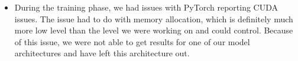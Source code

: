\begin{notsw}
\begin{itemize}
    \item During the training phase, we had issues with PyTorch reporting CUDA issues. The issue had to do with memory allocation, which is definitely much more low level than the level we were working on and could control. Because of this issue, we were not able to get results for one of our model architectures and have left this architecture out.
    
\end{itemize}

\end{notsw}